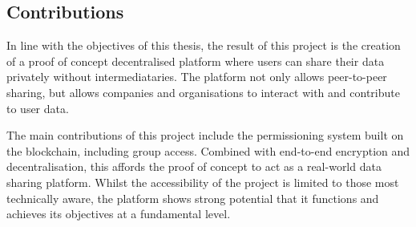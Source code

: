 \subsection{Contributions}

In line with the objectives of this thesis, the result of this project is the creation of a proof of concept decentralised platform where users can share their data privately without intermediataries. The platform not only allows peer-to-peer sharing, but allows companies and organisations to interact with and contribute to user data.

The main contributions of this project include the permissioning system built on the blockchain, including group access. Combined with end-to-end encryption and decentralisation, this affords the proof of concept to act as a real-world data sharing platform. Whilst the accessibility of the project is limited to those most technically aware, the platform shows strong potential that it functions and achieves its objectives at a fundamental level.
